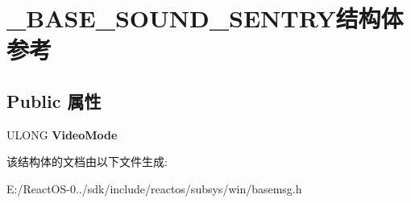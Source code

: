 \hypertarget{struct___b_a_s_e___s_o_u_n_d___s_e_n_t_r_y}{}\section{\+\_\+\+B\+A\+S\+E\+\_\+\+S\+O\+U\+N\+D\+\_\+\+S\+E\+N\+T\+R\+Y结构体 参考}
\label{struct___b_a_s_e___s_o_u_n_d___s_e_n_t_r_y}
\subsection*{Public 属性}
\begin{DoxyCompactItemize}
\item 
\mbox{\label{struct___b_a_s_e___s_o_u_n_d___s_e_n_t_r_y_ad80f3cd93f1a82ee7809e685163f493f}} 
U\+L\+O\+NG {\bfseries Video\+Mode}
\end{DoxyCompactItemize}


该结构体的文档由以下文件生成\+:\begin{DoxyCompactItemize}
\item 
E\+:/\+React\+O\+S-\/0../sdk/include/reactos/subsys/win/basemsg.\+h\end{DoxyCompactItemize}
